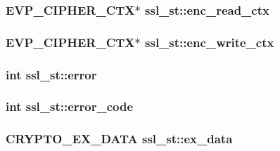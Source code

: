 \hypertarget{structssl__st_ae2efb2324ed8b45b65cc2a3aa5ac1a4d}{
\subsubsection[{enc\-\_\-read\-\_\-ctx}]{\setlength{\rightskip}{0pt plus 5cm}E\-V\-P\-\_\-\-C\-I\-P\-H\-E\-R\-\_\-\-C\-T\-X$\ast$ ssl\-\_\-st\-::enc\-\_\-read\-\_\-ctx}}\label{structssl__st_ae2efb2324ed8b45b65cc2a3aa5ac1a4d}
\hypertarget{structssl__st_a44444bb7794521afc2b9e52cd0c2570c}{
\subsubsection[{enc\-\_\-write\-\_\-ctx}]{\setlength{\rightskip}{0pt plus 5cm}E\-V\-P\-\_\-\-C\-I\-P\-H\-E\-R\-\_\-\-C\-T\-X$\ast$ ssl\-\_\-st\-::enc\-\_\-write\-\_\-ctx}}\label{structssl__st_a44444bb7794521afc2b9e52cd0c2570c}
\hypertarget{structssl__st_aca7ac14e5548bdd96990fa1d12aaef02}{
\subsubsection[{error}]{\setlength{\rightskip}{0pt plus 5cm}int ssl\-\_\-st\-::error}}\label{structssl__st_aca7ac14e5548bdd96990fa1d12aaef02}
\hypertarget{structssl__st_a6a6c337340e6b5986ca6a1381838c9ae}{
\subsubsection[{error\-\_\-code}]{\setlength{\rightskip}{0pt plus 5cm}int ssl\-\_\-st\-::error\-\_\-code}}\label{structssl__st_a6a6c337340e6b5986ca6a1381838c9ae}
\hypertarget{structssl__st_ab71808924564517a2cfa30d1d5da910e}{
\subsubsection[{ex\-\_\-data}]{\setlength{\rightskip}{0pt plus 5cm}C\-R\-Y\-P\-T\-O\-\_\-\-E\-X\-\_\-\-D\-A\-T\-A ssl\-\_\-st\-::ex\-\_\-data}}\label{structssl__st_ab71808924564517a2cfa30d1d5da910e}
